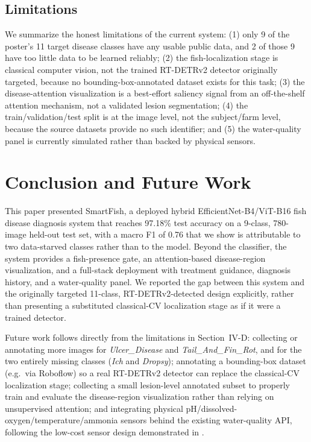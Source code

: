 \documentclass[conference]{IEEEtran}
\begin{document}
\subsection{Limitations}
We summarize the honest limitations of the current system: (1) only 9 of the poster's 11 target disease classes have any usable public data, and 2 of those 9 have too little data to be learned reliably; (2) the fish-localization stage is classical computer vision, not the trained RT-DETRv2 detector originally targeted, because no bounding-box-annotated dataset exists for this task; (3) the disease-attention visualization is a best-effort saliency signal from an off-the-shelf attention mechanism, not a validated lesion segmentation; (4) the train/validation/test split is at the image level, not the subject/farm level, because the source datasets provide no such identifier; and (5) the water-quality panel is currently simulated rather than backed by physical sensors.

\section{Conclusion and Future Work}
This paper presented SmartFish, a deployed hybrid EfficientNet-B4/ViT-B16 fish disease diagnosis system that reaches 97.18\% test accuracy on a 9-class, 780-image held-out test set, with a macro F1 of 0.76 that we show is attributable to two data-starved classes rather than to the model. Beyond the classifier, the system provides a fish-presence gate, an attention-based disease-region visualization, and a full-stack deployment with treatment guidance, diagnosis history, and a water-quality panel. We reported the gap between this system and the originally targeted 11-class, RT-DETRv2-detected design explicitly, rather than presenting a substituted classical-CV localization stage as if it were a trained detector.

Future work follows directly from the limitations in Section~IV-D: collecting or annotating more images for \emph{Ulcer\_Disease} and \emph{Tail\_And\_Fin\_Rot}, and for the two entirely missing classes (\emph{Ich} and \emph{Dropsy}); annotating a bounding-box dataset (e.g.\ via Roboflow) so a real RT-DETRv2 detector can replace the classical-CV localization stage; collecting a small lesion-level annotated subset to properly train and evaluate the disease-region visualization rather than relying on unsupervised attention; and integrating physical pH/dissolved-oxygen/temperature/ammonia sensors behind the existing water-quality API, following the low-cost sensor design demonstrated in \cite{mohdjais2024}.



\end{document}
